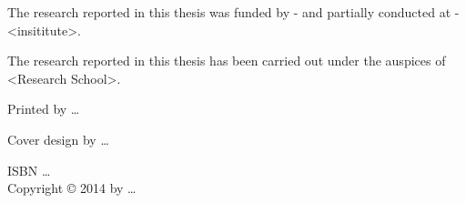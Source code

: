 \thispagestyle{empty}

\normalsize

\hspace{0em}
\vfill
 

\begin{center}

\noindent The research reported in this thesis was funded by - and partially
conducted at - <insititute>.
\vspace{2em}

\noindent The research reported in this thesis has been carried out under the
auspices of <Research School>.
\vspace{2em}

\noindent Printed by \ldots
\vspace{2em}
 
\noindent Cover design by \ldots
\vspace{2em}
 
\noindent ISBN \ldots\\
\vspace{2em}
\noindent Copyright \copyright \hspace{0.1mm} 2014 by \ldots

\end{center}

\vfill